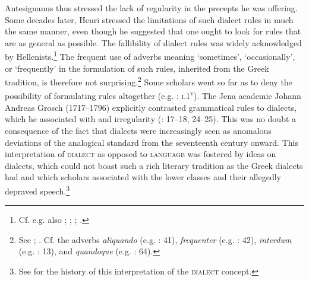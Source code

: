 Antesignanus thus stressed the lack of regularity in the precepts he was offering. Some decades later, Henri \citet[46--47]{Estienne1581} stressed the limitations of such dialect rules in much the same manner, even though he suggested that one ought to look for rules that are as general as possible. The fallibility of dialect rules was widely acknowledged by Hellenists.\footnote{{Cf. e.g. also \citet[38--39]{Schmidt1604}; \citet[2]{Heupel1712}; \citet[1136, 1139]{[frisch]1730}; \citet[299]{Jehne1782}.}} The frequent use of adverbs meaning ‘sometimes’, ‘occasionally’, or ‘frequently’ in the formulation of such rules, inherited from the Greek tradition, is therefore not surprising.\footnote{{See \citet[53]{Forstel1999}; \citet[516]{VanRooy2014}. Cf. the adverbs} {\textit{aliquando}} {(e.g. \citealt{Walper1589}: 41),} {\textit{frequenter}} {(e.g. \citealt{Walper1589}: 42),} {\textit{interdum}} {(e.g. \citealt{Antesignanus1554}: 13),}{ }{and} {\textit{quandoque}} {(e.g. \citealt{Walper1589}: 64).}} Some scholars went so far as to deny the possibility of formulating rules altogether (e.g. \citealt{Camden1595}: \textsc{i}.1\textsc{\textsuperscript{v}}). The Jena academic Johann Andreas Grosch (1717–1796) explicitly contrasted grammatical rules to dialects, which he associated with  and irregularity (\citealt{Grosch1753}: 17–18, 24–25). This was no doubt a consequence of the fact that dialects were increasingly seen as anomalous deviations of the analogical standard from the seventeenth century onward. This interpretation of \textsc{dialect} as opposed to \textsc{language} was fostered by ideas on  dialects, which could not boast such a rich literary tradition as the Greek dialects had and which scholars associated with the lower classes and their allegedly depraved speech.\footnote{{See \citet[]{VanRooyFcd} for the history of this interpretation of the} {\textsc{dialect}} {concept.}}

